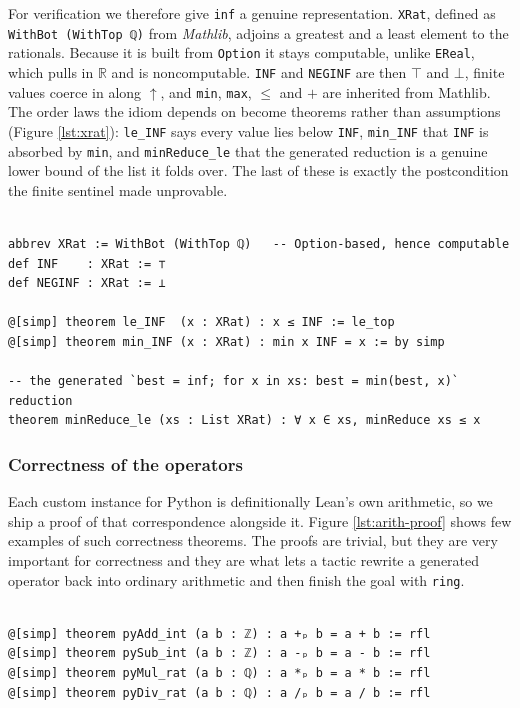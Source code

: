 \documentclass{article}
\newcommand{\code}{\lstinline}
\begin{document}
For verification we therefore give \code{inf} a genuine representation. \code{XRat}, defined as \code{WithBot (WithTop ℚ)} from \emph{Mathlib}, adjoins a greatest and a least element to the rationals. Because it is built from \code{Option} it stays computable, unlike \code{EReal}, which pulls in $\mathbb{R}$ and is noncomputable. \code{INF} and \code{NEGINF} are then $\top$ and $\bot$, finite values coerce in along $\uparrow$, and \code{min}, \code{max}, $\le$ and $+$ are inherited from Mathlib. The order laws the idiom depends on become theorems rather than assumptions (Figure \ref{lst:xrat}): \code{le_INF} says every value lies below \code{INF}, \code{min_INF} that \code{INF} is absorbed by \code{min}, and \code{minReduce_le} that the generated reduction is a genuine lower bound of the list it folds over. The last of these is exactly the postcondition the finite sentinel made unprovable.


\begin{lstlisting}[style=lean,caption={A provable \code{inf}: extended rationals and the laws a proof gets.},label={lst:xrat}]

abbrev XRat := WithBot (WithTop ℚ)   -- Option-based, hence computable
def INF    : XRat := ⊤
def NEGINF : XRat := ⊥

@[simp] theorem le_INF  (x : XRat) : x ≤ INF := le_top
@[simp] theorem min_INF (x : XRat) : min x INF = x := by simp

-- the generated `best = inf; for x in xs: best = min(best, x)` reduction
theorem minReduce_le (xs : List XRat) : ∀ x ∈ xs, minReduce xs ≤ x
\end{lstlisting}



\subsubsection{Correctness of the operators} \label{arith-correct}

Each custom instance for Python is definitionally Lean's own arithmetic, so we ship a proof of that correspondence alongside it. Figure \ref{lst:arith-proof} shows few examples of such correctness theorems. The proofs are trivial, but they are very important for correctness and they are what lets a tactic rewrite a generated operator back into ordinary arithmetic and then finish the goal with \code{ring}.

\begin{lstlisting}[style=lean,caption={Arithmetic Operation Proofs},label={lst:arith-proof}]

@[simp] theorem pyAdd_int (a b : ℤ) : a +ₚ b = a + b := rfl
@[simp] theorem pySub_int (a b : ℤ) : a -ₚ b = a - b := rfl
@[simp] theorem pyMul_rat (a b : ℚ) : a *ₚ b = a * b := rfl
@[simp] theorem pyDiv_rat (a b : ℚ) : a /ₚ b = a / b := rfl

\end{lstlisting}
\end{document}
